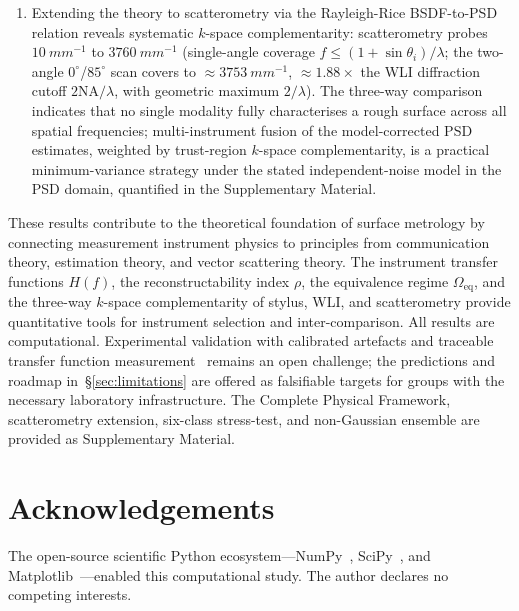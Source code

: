 \documentclass[review,12pt]{elsarticle}
\begin{document}
\begin{enumerate}
    \item Extending the theory to scatterometry via the Rayleigh-Rice BSDF-to-PSD relation reveals systematic $k$-space complementarity: scatterometry probes $\SI{10}{mm^{-1}}$ to $\SI{3760}{mm^{-1}}$ (single-angle coverage $f \le (1+\sin\theta_i)/\lambda$; the two-angle $0^\circ$/$85^\circ$ scan covers to $\approx\SI{3753}{mm^{-1}}$, $\approx1.88\times$ the WLI diffraction cutoff $2\mathrm{NA}/\lambda$, with geometric maximum $2/\lambda$). The three-way comparison indicates that no single modality fully characterises a rough surface across all spatial frequencies; multi-instrument fusion of the model-corrected PSD estimates, weighted by trust-region $k$-space complementarity, is a practical minimum-variance strategy under the stated independent-noise model in the PSD domain, quantified in the Supplementary Material.
\end{enumerate}

These results contribute to the theoretical foundation of surface metrology by connecting measurement instrument physics to principles from communication theory, estimation theory, and vector scattering theory. The instrument transfer functions $H(f)$, the reconstructability index $\rho$, the equivalence regime $\Omega_\mathrm{eq}$, and the three-way $k$-space complementarity of stylus, WLI, and scatterometry provide quantitative tools for instrument selection and inter-comparison. All results are computational. Experimental validation with calibrated artefacts and traceable transfer function measurement~\cite{yashchuk2015binary} remains an open challenge; the predictions and roadmap in~\S\ref{sec:limitations} are offered as falsifiable targets for groups with the necessary laboratory infrastructure. The Complete Physical Framework, scatterometry extension, six-class stress-test, and non-Gaussian ensemble are provided as Supplementary Material.

\section*{Acknowledgements}
The open-source scientific Python ecosystem---NumPy~\cite{harris2020numpy}, SciPy~\cite{virtanen2020scipy}, and Matplotlib~\cite{hunter2007matplotlib}---enabled this computational study. The author declares no competing interests.
\end{document}
